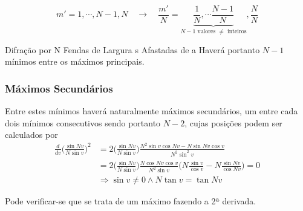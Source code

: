 \documentclass[a4paper,12pt]{article}
\begin{document}
\begin{equation*}
	\label{eq:fendasminimos}
	m' =1, \cdots, N-1, N  \quad \rightarrow \quad \frac{m'}{N} = \underbrace{\frac{1}{N}, \cdots  \frac{N-1}{N}}_{N-1 \text{ valores } \ne \text{ inteiros}} , \frac{N}{N}
\end{equation*}

Difração por N Fendas de Largura s Afastadas de a
Haverá  portanto $N-1$ mínimos entre os máximos principais. 
\subsubsection{Máximos Secundários}
Entre estes mínimos haverá naturalmente máximos secundários, um entre cada dois mínimos consecutivos sendo portanto $N-2$, cujas posições podem ser calculados por
\begin{align}
	\frac{d}{d v} \big( \frac{\sin N v }{N \sin v} \big)^2 &= 2 \big( \frac{\sin N v }{N \sin v} \big)
	 \frac{N^2 \sin v \cos N v - N \sin N v \cos v }{N^2 \sin^2 v} \nonumber \\
	&= 2 \big( \frac{\sin N v }{N \sin v} \big)  \frac{N \cos N v \cos v}{N^2 \sin v}
	\big( N\frac{\sin v}{\cos v}  - N\frac{\sin N v}{\cos N v} \big) = 0 \nonumber \\
	&\Rightarrow \sin v \ne 0 \land N \tan v =  \tan Nv \label{eq:47}
\end{align}

Pode verificar-se que se trata de um máximo fazendo a 2ª derivada.
\end{document}
